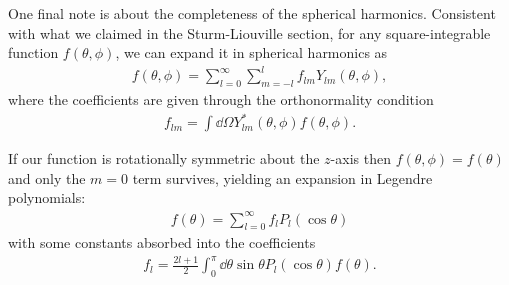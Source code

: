 One final note is about the completeness of the spherical harmonics.
Consistent with what we claimed in the Sturm-Liouville section, for any square-integrable function $f(\theta,\phi)$, we can expand it in spherical harmonics as
\begin{eqnarray}
    f(\theta,\phi) = \sum_{l=0}^{\infty} \sum_{m=-l}^{l} f_{lm} Y_{lm}(\theta,\phi)
,\end{eqnarray}
where the coefficients are given through the orthonormality condition
\begin{eqnarray}
    f_{lm} = \int \dd{\Omega} Y_{lm}^{*}(\theta,\phi) f(\theta,\phi)
.\end{eqnarray}

If our function is rotationally symmetric about the $z$-axis then $f(\theta,\phi) = f(\theta)$ and only the $m = 0$ term survives, yielding an expansion in Legendre polynomials:
\begin{eqnarray}
    f(\theta) = \sum_{l=0}^{\infty} f_{l} P_{l}(\cos{\theta})
\end{eqnarray}
with some constants absorbed into the coefficients
\begin{eqnarray}
    f_{l} = \frac{2l+1}{2} \int_{0}^{\pi} \dd{\theta} \sin{\theta} P_{l}(\cos{\theta}) f(\theta)
.\end{eqnarray}






